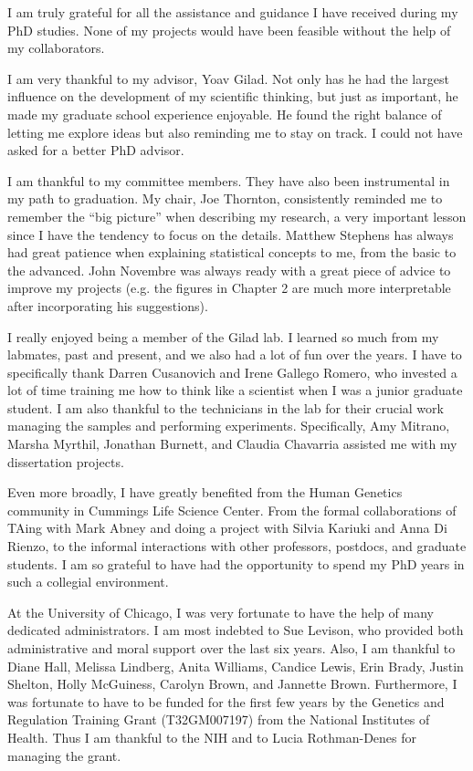 \acknowledgments

I am truly grateful for all the assistance and guidance I have
received during my PhD studies. None of my projects would have been
feasible without the help of my collaborators.

I am very thankful to my advisor, Yoav Gilad. Not only has he had the
largest influence on the development of my scientific thinking, but
just as important, he made my graduate school experience enjoyable. He
found the right balance of letting me explore ideas but also reminding
me to stay on track. I could not have asked for a better PhD advisor.

I am thankful to my committee members. They have also been
instrumental in my path to graduation. My chair, Joe Thornton,
consistently reminded me to remember the ``big picture'' when
describing my research, a very important lesson since I have the
tendency to focus on the details. Matthew Stephens has always had
great patience when explaining statistical concepts to me, from the
basic to the advanced. John Novembre was always ready with a great
piece of advice to improve my projects (e.g. the figures in Chapter 2
are much more interpretable after incorporating his suggestions).

I really enjoyed being a member of the Gilad lab. I learned so much
from my labmates, past and present, and we also had a lot of fun over
the years. I have to specifically thank Darren Cusanovich and Irene
Gallego Romero, who invested a lot of time training me how to think
like a scientist when I was a junior graduate student. I am also
thankful to the technicians in the lab for their crucial work managing
the samples and performing experiments. Specifically, Amy Mitrano,
Marsha Myrthil, Jonathan Burnett, and Claudia Chavarria assisted me
with my dissertation projects.

Even more broadly, I have greatly benefited from the Human Genetics
community in Cummings Life Science Center. From the formal
collaborations of TAing with Mark Abney and doing a project with
Silvia Kariuki and Anna Di Rienzo, to the informal interactions with
other professors, postdocs, and graduate students. I am so grateful to
have had the opportunity to spend my PhD years in such a collegial
environment.

At the University of Chicago, I was very fortunate to have the help of
many dedicated administrators. I am most indebted to Sue Levison, who
provided both administrative and moral support over the last six
years. Also, I am thankful to Diane Hall, Melissa Lindberg, Anita
Williams, Candice Lewis, Erin Brady, Justin Shelton, Holly McGuiness,
Carolyn Brown, and Jannette Brown. Furthermore, I was fortunate to
have to be funded for the first few years by the Genetics and
Regulation Training Grant (T32GM007197) from the National Institutes
of Health. Thus I am thankful to the NIH and to Lucia Rothman-Denes
for managing the grant.

